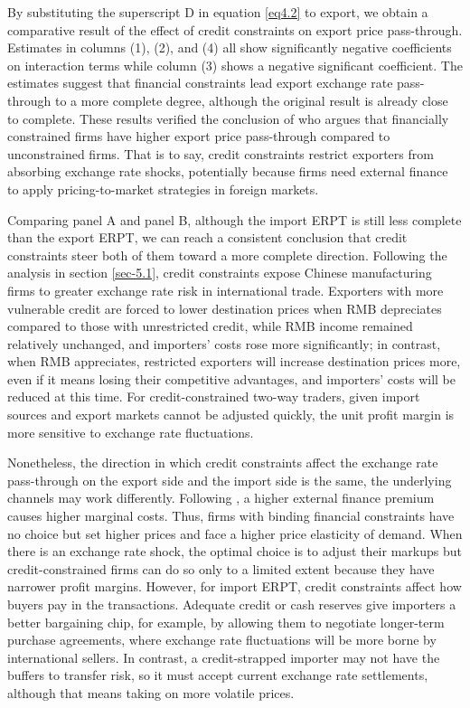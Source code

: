 By substituting the superscript D in equation \ref{eq4.2} to export, we obtain a comparative result of the effect of credit constraints on export price pass-through. Estimates in columns (1), (2), and (4) all show significantly negative coefficients on interaction terms while column (3) shows a negative significant coefficient. The estimates suggest that financial constraints lead export exchange rate pass-through to a more complete degree, although the original result is already close to complete. These results verified the conclusion of \cite{strasser2013} who argues that financially constrained firms have higher export price pass-through compared to unconstrained firms. That is to say, credit constraints restrict exporters from absorbing exchange rate shocks, potentially because firms need external finance to apply pricing-to-market strategies in foreign markets.

Comparing panel A and panel B, although the import ERPT is still less complete than the export ERPT, we can reach a consistent conclusion that credit constraints steer both of them toward a more complete direction. Following the analysis in section \ref{sec-5.1}, credit constraints expose Chinese manufacturing firms to greater exchange rate risk in international trade. Exporters with more vulnerable credit are forced to lower destination prices when RMB depreciates compared to those with unrestricted credit, while RMB income remained relatively unchanged, and importers’ costs rose more significantly; in contrast, when RMB appreciates, restricted exporters will increase destination prices more, even if it means losing their competitive advantages, and importers' costs will be reduced at this time. For credit-constrained two-way traders, given import sources and export markets cannot be adjusted quickly, the unit profit margin is more sensitive to exchange rate fluctuations.

Nonetheless, the direction in which credit constraints affect the exchange rate pass-through on the export side and the import side is the same, the underlying channels may work differently. Following \cite{strasser2013}, a higher external finance premium causes higher marginal costs. Thus, firms with binding financial constraints have no choice but set higher prices and face a higher price elasticity of demand. When there is an exchange rate shock, the optimal choice is to adjust their markups but credit-constrained firms can do so only to a limited extent because they have narrower profit margins. However, for import ERPT, credit constraints affect how buyers pay in the transactions. Adequate credit or cash reserves give importers a better bargaining chip, for example, by allowing them to negotiate longer-term purchase agreements, where exchange rate fluctuations will be more borne by international sellers. In contrast, a credit-strapped importer may not have the buffers to transfer risk, so it must accept current exchange rate settlements, although that means taking on more volatile prices.

